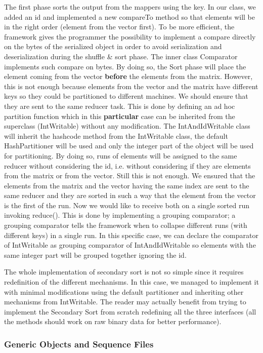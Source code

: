 \documentclass[a4paper,12pt]{article}
\begin{document}
The first phase sorts the output from the mappers using the key. 
In our class, we added an id and implemented a new compareTo method so that elements will be in the right order (element from the vector first).
To be more efficient, the framework gives the programmer the possibility to implement a compare directly on the bytes of the serialized object in order to avoid serialization and deserialization during the shuffle \& sort phase.
The inner class Comparator implements such compare on bytes.
By doing so, the Sort phase will place the element coming from the vector \textbf{before} the elements from the matrix.
However, this is not enough because elements from the vector and the matrix have different keys so they could be partitioned to different machines.
We should ensure that they are sent to the same reducer task.
This is done by defining an ad hoc partition function which in this \textbf{particular} case can be inherited from the superclass (IntWritable) without any modification. 
The IntAndIdWritable class will inherit the hashcode method from the IntWritable class, the default HashPartitioner will be used and only the integer part of the object will be used for partitioning.
By doing so, runs of elements will be assigned to the same reducer without considering the id, i.e. without considering if they are elements from the matrix or from the vector.
Still this is not enough. 
We ensured that the elements from the matrix and the vector having the same index are sent to the same reducer and they are sorted in such a way that the element from the vector is the first of the run. 
Now we would like to receive both on a single sorted run invoking reduce().
This is done by implementing a grouping comparator; a grouping comparator tells the framework when to collapse different runs (with different keys) in a single run. 
In this specific case, we can declare the comparator of IntWritable as grouping comparator of IntAndIdWritable so elements with the same integer part will be grouped together ignoring the id.

The whole implementation of secondary sort is not so simple since it requires redefinition of the different mechanisms.
In this case, we managed to implement it with minimal modifications using the default partitioner and inheriting other mechanisms from IntWritable. 
The reader may actually benefit from trying to implement the Secondary Sort from scratch redefining all the three interfaces (all the methods should work on raw binary data for better performance).

\subsubsection{Generic Objects and Sequence Files}
\end{document}
